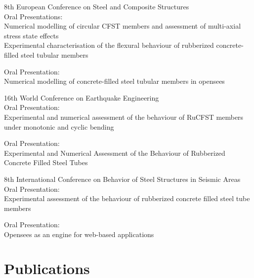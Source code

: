 \documentclass{../Template/my_cv}
\begin{document}
 {
  8th European Conference on Steel and Composite Structures \\

  Oral Presentations:\\
  Numerical modelling of circular CFST members and assessment of multi-axial stress state effects\\

  Experimental characterisation of the flexural behaviour of rubberized concrete-filled steel tubular members
}

 {
  Oral Presentation: \\

  Numerical modelling of concrete-filled steel tubular members in opensees
}

 {
  16th World Conference on Earthquake Engineering \\

  Oral Presentation: \\

  Experimental and numerical assessment of the behaviour of RuCFST members under monotonic and cyclic bending
}

 {
  Oral Presentation: \\

  Experimental and Numerical Assessment of the Behaviour of Rubberized Concrete Filled Steel Tubes
}


 {
  8th International Conference on Behavior of Steel Structures in Seismic Areas \\
  
  Oral Presentation: \\

  Experimental assessment of the behaviour of rubberized concrete filled steel tube members
}

 {
  Oral Presentation: \\

  Opensees as an engine for web-based applications
}

\section{Publications}
\end{document}

